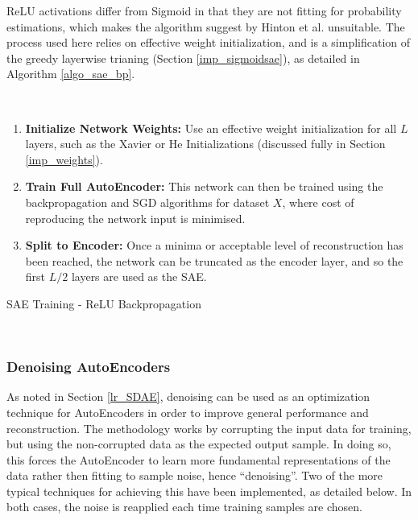 \documentclass[a4paper,11pt,oneside]{article}
\theoremstyle{plain}
\theoremstyle{definition}
\begin{document}
	ReLU activations differ from Sigmoid in that they are not fitting for probability estimations, which makes the algorithm suggest by Hinton et al. unsuitable. The process used here relies on effective weight initialization, and is a simplification of the greedy layerwise trianing (Section \ref{imp_sigmoidsae}), as detailed in Algorithm \ref{algo_sae_bp}. \newline 
	
	\begin{algorithm}[H]
		\texttt{\\}
		
	\begin{enumerate}
		\item \textbf{Initialize Network Weights:} Use an effective weight initialization for all $L$ layers, such as the Xavier or He Initializations (discussed fully in Section \ref{imp_weights}).
		\item  \textbf{Train Full AutoEncoder:} This network can then be trained using the backpropagation and SGD algorithms for dataset $X$, where cost of reproducing the network input is minimised.
		\item \textbf{Split to Encoder:} Once a minima or acceptable level of reconstruction has been reached, the network can be truncated as the encoder layer, and so the first $L/2$ layers are used as the SAE.
	\end{enumerate}
		
		\label{algo_sae_bp}
		\caption{SAE Training - ReLU Backpropagation}
	\end{algorithm}
	~\\
	
	\subsubsection{Denoising AutoEncoders}\label{imp_denoising}
	
	As noted in Section \ref{lr_SDAE}, denoising can be used as an optimization technique for AutoEncoders in order to improve general performance and reconstruction. The methodology works by corrupting the input data for training, but using the non-corrupted data as the expected output sample. In doing so, this forces the AutoEncoder to learn more fundamental representations of the data rather then fitting to sample noise, hence ``denoising''. Two of the more typical techniques for achieving this have been implemented, as detailed below. In both cases, the noise is reapplied each time training samples are chosen.
	
\end{document}
